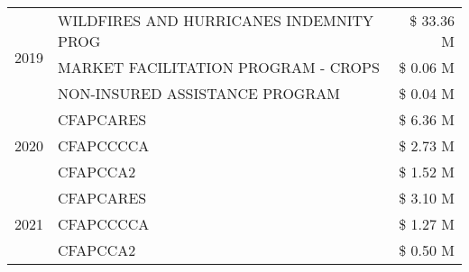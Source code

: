 \begin{tabular}{llr}
\cline{1-3}
\multirow[t]{3}{*}{2019} & WILDFIRES AND HURRICANES INDEMNITY PROG & \$ 33.36 M \\
 & MARKET FACILITATION PROGRAM - CROPS & \$ 0.06 M \\
 & NON-INSURED ASSISTANCE PROGRAM & \$ 0.04 M \\
\cline{1-3}
\multirow[t]{3}{*}{2020} & CFAPCARES & \$ 6.36 M \\
 & CFAPCCCCA & \$ 2.73 M \\
 & CFAPCCA2 & \$ 1.52 M \\
\cline{1-3}
\multirow[t]{3}{*}{2021} & CFAPCARES & \$ 3.10 M \\
 & CFAPCCCCA & \$ 1.27 M \\
 & CFAPCCA2 & \$ 0.50 M \\
\cline{1-3}
\bottomrule
\end{tabular}
